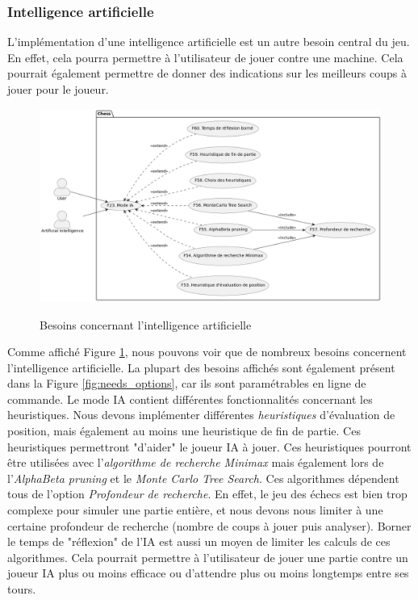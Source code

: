 \documentclass{article}
\begin{document}
\subsubsection{Intelligence artificielle}
\label{IA}
L'implémentation d'une intelligence artificielle est un autre besoin central du jeu. En effet, cela pourra
permettre à l'utilisateur de jouer contre une machine. Cela pourrait également permettre de donner des
indications sur les meilleurs coups à jouer pour le joueur.

\begin{figure}[h]
    \caption{Besoins concernant l'intelligence artificielle}
    \centering
    \includegraphics[width=\textwidth,height=\textheight,keepaspectratio]{needs_ai}
    \label{fig:needs_ai}
\end{figure}

Comme affiché Figure \ref{fig:needs_ai}, nous pouvons voir que de nombreux besoins
concernent l'intelligence artificielle.
La plupart des besoins affichés sont également présent dans la Figure \ref{fig:needs_options}, car ils sont paramétrables
en ligne de commande.
Le mode IA contient différentes fonctionnalités concernant les heuristiques. Nous devons implémenter différentes \textit{heuristiques}
d'évaluation de position, mais également au moins une heuristique de fin de partie. Ces heuristiques permettront "d'aider" le joueur IA
à jouer. Ces heuristiques pourront être utilisées avec l'\textit{algorithme de recherche Minimax} mais également lors de l'\textit{AlphaBeta pruning} 
et le \textit{Monte Carlo Tree Search}. Ces algorithmes dépendent tous de l'option \textit{Profondeur de recherche}. En effet, le jeu des échecs est bien 
trop complexe pour simuler une partie entière, et nous devons nous limiter à une certaine profondeur de recherche (nombre de coups à jouer puis analyser).
Borner le temps de "réflexion" de l'IA est aussi un moyen de limiter les calculs de ces algorithmes. Cela pourrait permettre à l'utilisateur de jouer une partie contre
un joueur IA plus ou moins efficace ou d'attendre plus ou moins longtemps entre ses tours.
\end{document}
